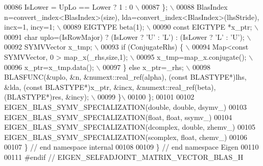 \begin{DoxyCode}
00086 \textcolor{preprocessor}{    IsLower = UpLo == Lower ? 1 : 0 \(\backslash\)}
00087 \textcolor{preprocessor}{  \}; \(\backslash\)}
00088 \textcolor{preprocessor}{  BlasIndex n=convert\_index<BlasIndex>(size), lda=convert\_index<BlasIndex>(lhsStride), incx=1, incy=1; \(\backslash\)}
00089 \textcolor{preprocessor}{  EIGTYPE beta(1); \(\backslash\)}
00090 \textcolor{preprocessor}{  const EIGTYPE *x\_ptr; \(\backslash\)}
00091 \textcolor{preprocessor}{  char uplo=(IsRowMajor) ? (IsLower ? 'U' : 'L') : (IsLower ? 'L' : 'U'); \(\backslash\)}
00092 \textcolor{preprocessor}{  SYMVVector x\_tmp; \(\backslash\)}
00093 \textcolor{preprocessor}{  if (ConjugateRhs) \{ \(\backslash\)}
00094 \textcolor{preprocessor}{    Map<const SYMVVector, 0 > map\_x(\_rhs,size,1); \(\backslash\)}
00095 \textcolor{preprocessor}{    x\_tmp=map\_x.conjugate(); \(\backslash\)}
00096 \textcolor{preprocessor}{    x\_ptr=x\_tmp.data(); \(\backslash\)}
00097 \textcolor{preprocessor}{  \} else x\_ptr=\_rhs; \(\backslash\)}
00098 \textcolor{preprocessor}{  BLASFUNC(&uplo, &n, &numext::real\_ref(alpha), (const BLASTYPE*)lhs, &lda, (const BLASTYPE*)x\_ptr, &incx,
       &numext::real\_ref(beta), (BLASTYPE*)res, &incy); \(\backslash\)}
00099 \textcolor{preprocessor}{\}\(\backslash\)}
00100 \textcolor{preprocessor}{\};}
00101 
00102 EIGEN\_BLAS\_SYMV\_SPECIALIZATION(\textcolor{keywordtype}{double},   \textcolor{keywordtype}{double}, dsymv\_)
00103 EIGEN\_BLAS\_SYMV\_SPECIALIZATION(\textcolor{keywordtype}{float},    \textcolor{keywordtype}{float},  ssymv\_)
00104 EIGEN\_BLAS\_SYMV\_SPECIALIZATION(dcomplex, \textcolor{keywordtype}{double}, zhemv\_)
00105 EIGEN\_BLAS\_SYMV\_SPECIALIZATION(scomplex, \textcolor{keywordtype}{float},  chemv\_)
00106 
00107 \} \textcolor{comment}{// end namespace internal}
00108 
00109 \} \textcolor{comment}{// end namespace Eigen}
00110 
00111 \textcolor{preprocessor}{#endif // EIGEN\_SELFADJOINT\_MATRIX\_VECTOR\_BLAS\_H}
\end{DoxyCode}
